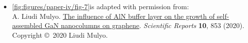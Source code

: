 \begin{itemize} [wide=0em, leftmargin=*, label=]
    \item \ref{fig:figures/paper-iv/fig-7}is adapted with permission from: \\ A. Liudi Mulyo. \href{https://www.nature.com/articles/s41598-019-55424-z}{The influence of AlN buffer layer on the growth of self-assembled GaN nanocolumns on graphene}. \textit{Scientific Reports} \textbf{10}, 853 (2020). \\ Copyright \copyright \ 2020 Liudi Mulyo.
        
\end{itemize}